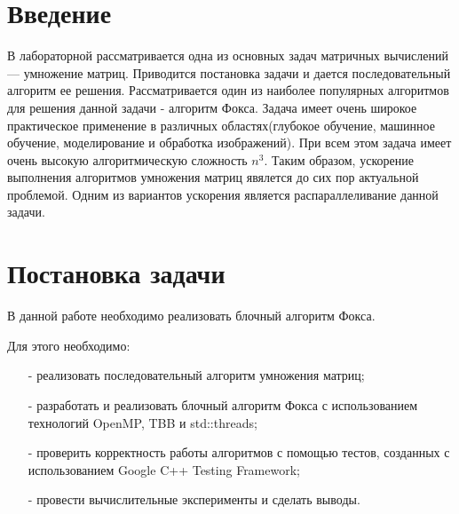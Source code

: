 \documentclass{report}
\begin{document}
\setcounter{page}{2}

\tableofcontents
\newpage

\section*{Введение}
В лабораторной рассматривается одна из основных задач матричных вычислений — умножение матриц. Приводится постановка задачи и дается последовательный алгоритм ее решения. Рассматривается один из наиболее популярных алгоритмов для решения данной задачи - алгоритм Фокса. Задача имеет очень широкое практическое применение в различных областях(глубокое обучение, машинное обучение, моделирование и обработка изображений). При всем этом задача имеет очень высокую алгоритмическую сложность $n^3$. Таким образом, ускорение выполнения алгоритмов умножения матриц явялется до сих пор актуальной проблемой. Одним из вариантов ускорения является распараллеливание данной задачи.
\newpage

\section*{Постановка задачи}
В данной работе необходимо реализовать блочный алгоритм Фокса.
\par
Для этого необходимо:
\begin{itemize}
    \item[-] реализовать последовательный алгоритм умножения матриц;
    \item[-] разработать и реализовать блочный алгоритм Фокса с использованием технологий OpenMP, TBB и std::threads;
    \item[-] проверить корректность работы алгоритмов с помощью тестов, созданных с использованием Google C++ Testing Framework;
    \item[-] провести вычислительные эксперименты и сделать выводы.
\end{itemize}
\newpage

\end{document}
